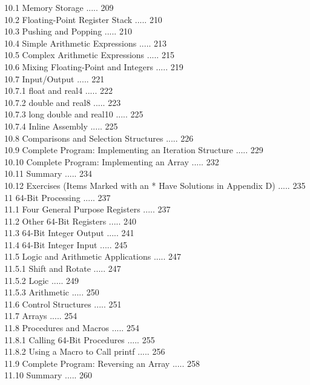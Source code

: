 \documentclass[10pt]{article}
\begin{document}
10.1 Memory Storage ..... 209\\
10.2 Floating-Point Register Stack ..... 210\\
10.3 Pushing and Popping ..... 210\\
10.4 Simple Arithmetic Expressions ..... 213\\
10.5 Complex Arithmetic Expressions ..... 215\\
10.6 Mixing Floating-Point and Integers ..... 219\\
10.7 Input/Output ..... 221\\
10.7.1 float and real4 ..... 222\\
10.7.2 double and real8 ..... 223\\
10.7.3 long double and real10 ..... 225\\
10.7.4 Inline Assembly ..... 225\\
10.8 Comparisons and Selection Structures ..... 226\\
10.9 Complete Program: Implementing an Iteration Structure ..... 229\\
10.10 Complete Program: Implementing an Array ..... 232\\
10.11 Summary ..... 234\\
10.12 Exercises (Items Marked with an * Have Solutions in Appendix D) ..... 235\\
11 64-Bit Processing ..... 237\\
11.1 Four General Purpose Registers ..... 237\\
11.2 Other 64-Bit Registers ..... 240\\
11.3 64-Bit Integer Output ..... 241\\
11.4 64-Bit Integer Input ..... 245\\
11.5 Logic and Arithmetic Applications ..... 247\\
11.5.1 Shift and Rotate ..... 247\\
11.5.2 Logic ..... 249\\
11.5.3 Arithmetic ..... 250\\
11.6 Control Structures ..... 251\\
11.7 Arrays ..... 254\\
11.8 Procedures and Macros ..... 254\\
11.8.1 Calling 64-Bit Procedures ..... 255\\
11.8.2 Using a Macro to Call printf ..... 256\\
11.9 Complete Program: Reversing an Array ..... 258\\
11.10 Summary ..... 260\\
\end{document}
